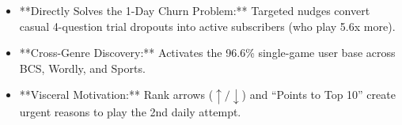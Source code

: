 \begin{tcolorbox}[summarybox, title={Chapter Key Takeaways}]
\begin{itemize}
    \item **Directly Solves the 1-Day Churn Problem:** Targeted nudges convert casual 4-question trial dropouts into active subscribers (who play 5.6x more).
    \item **Cross-Genre Discovery:** Activates the 96.6\% single-game user base across BCS, Wordly, and Sports.
    \item **Visceral Motivation:** Rank arrows ($\uparrow/\downarrow$) and ``Points to Top 10'' create urgent reasons to play the 2nd daily attempt.
\end{itemize}
\end{tcolorbox}
